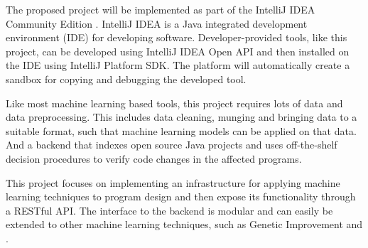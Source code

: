The proposed project will be implemented as part of the IntelliJ IDEA Community
Edition \cite{jet2017intellij}. IntelliJ IDEA is a Java integrated
development environment (IDE) for developing software. Developer-provided tools,
like this project, can be developed using IntelliJ IDEA Open API and then
installed on the IDE using IntelliJ Platform SDK. The platform will
automatically create a sandbox for copying and debugging the developed tool.

Like most machine learning based tools, this project requires lots of data and
data preprocessing. This includes data cleaning, munging and bringing data
to a suitable format, such that machine learning models can be applied on
that data. And a backend that indexes open source Java projects and uses
off-the-shelf decision procedures to verify code changes in the affected
programs.

This project focuses on implementing an infrastructure for applying machine
learning techniques to program design and then expose its functionality
through a RESTful API. The interface to the backend is modular and can easily
be extended to other machine learning techniques, such as Genetic Improvement
\cite{white2011evolutionary} and .



